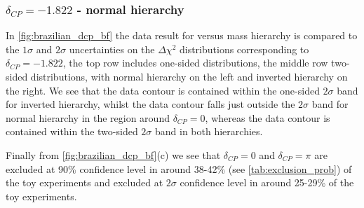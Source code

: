 \begin{table}[htb]
	\centering
	
	\caption{
		The fraction of toy experiments for which $\delta_{CP} = 0, \pi$ and normal and inverted hierarchy are excluded at 90\% and $2\sigma$ CL is shown. 10k toy experiments are used.
	}
	\label{tab:exclusion_prob}
\end{table}

\FloatBarrier
\iffalse
\subsubsection{$\delta_{CP} = -1.822$ - normal hierarchy}

In \cref{fig:brazilian_dcp_bf} the \RunPeriod data result for \deltacp versus mass hierarchy is compared to the $1\sigma$ and $2\sigma$ uncertainties on the $\Delta\chi^2$ distributions corresponding to $\delta_{CP} = -1.822$, the top row includes one-sided distributions, the middle row two-sided distributions, with normal hierarchy on the left and inverted hierarchy on the right. We see that the data contour is contained within the one-sided $2\sigma$ band for inverted hierarchy, whilst the data contour falls just outside the $2\sigma$ band for normal hierarchy in the region around $\delta_{CP} = 0$, whereas the data contour is contained within the two-sided $2\sigma$ band in both hierarchies.

Finally from \cref{fig:brazilian_dcp_bf}(c) we see that $\delta_{CP} = 0$ and $\delta_{CP} = \pi$ are excluded at 90\% confidence level in around 38-42\% (see \cref{tab:exclusion_prob}) of the toy experiments and excluded at $2\sigma$ confidence level in around 25-29\% of the toy experiments.


